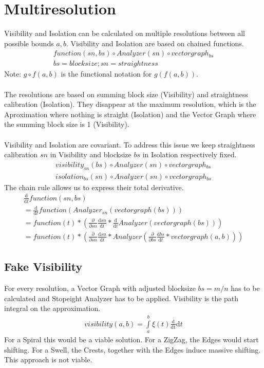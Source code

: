 \documentclass{report}
\begin{document}
\chapter{Multiresolution}
Visibility and Isolation can be calculated on multiple resolutions between all possible bounds $a,b$.
Visibility and Isolation are based on chained functions.
\begin{align*}
function(sn,bs) \circ Analyzer(sn) \circ vectorgraph_{bs}\\
bs=blocksize;sn=straightness
\end{align*}
Note: $g \circ f(a,b)$ is the functional notation for $g(f(a,b))$.\\\\
The resolutions are based on summing block size (Visibility) and straightness calibration (Isolation). They disappear at the maximum resolution, which is the Aproximation where nothing is straight (Isolation) and the Vector Graph where the summing block size is 1 (Visibility).\\\\
Visibility and Isolation are covariant. To address this issue we keep straightness calibration $sn$ in Visibility and blocksize $bs$ in Isolation respectively fixed.
\begin{align}
visibility_{sn}(bs) \circ Analyzer(sn) \circ vectorgraph_{bs}\\
isolation_{bs}(sn) \circ Analyzer(sn) \circ vectorgraph_{bs}
\end{align}
The chain rule allows us to express their total derivative.
\begin{align}
\frac{\mathrm{d}}{\mathrm{d} t} function (sn,bs)\\
= \frac{\mathrm{d}}{\mathrm{d} t} function (Analyzer_{sn}(vectorgraph(bs)))\\
= function(t)* (\frac{\partial}{\partial sn}  \frac{\mathrm{d} sn}{\mathrm{d}t} * \frac{\mathrm{d}}{\mathrm{d} t}Analyzer(vectorgraph(bs)))\\
= function(t)* (\frac{\partial}{\partial sn}  \frac{\mathrm{d} sn}{\mathrm{d}t} * Analyzer(\frac{\partial}{\partial bs} \frac{\mathrm{d} bs}{\mathrm{d}t}*vectorgraph(a,b)))
\end{align}

\section{Fake Visibility}
For every resolution, a Vector Graph with adjusted blocksize $bs=m/n$ has to be calculated and Stopeight Analyzer has to be applied.
Visibility is the path integral on the approximation.
\begin{align}
visibility(a,b)=\int \limits _{a}^{b} \xi(t)\frac{\mathrm{d}}{\mathrm{dt}} \mathrm{d}t
\end{align}
For a Spiral this would be a viable solution.
For a ZigZag, the Edges would start shifting.
For a Swell, the Crests, together with the Edges induce massive shifting.
This approach is not viable.
\end{document}

